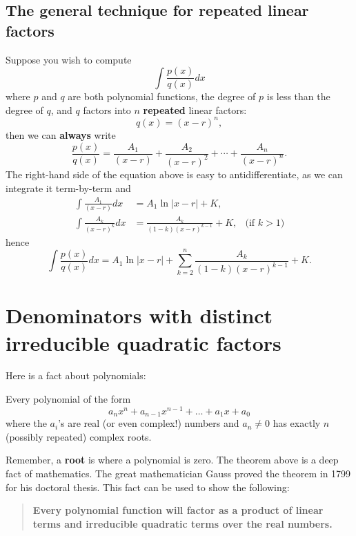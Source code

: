 \documentclass{ximera}
\begin{document}
\subsection{The general technique for repeated linear factors}

Suppose you wish to compute
\[
\int \frac{p(x)}{q(x)} dx
\]
where $p$ and $q$ are both polynomial functions, the degree of $p$ is
less than the degree of $q$, and $q$ factors into $n$
\textbf{repeated} linear factors:
\[
q(x) = (x-r)^n,
\]
then we can \textbf{always} write
\[
\frac{p(x)}{q(x)}  = \frac{A_1}{(x-r)} + \frac{A_2}{(x-r)^2} + \cdots + \frac{A_n}{(x-r)^n}. 
\]
The right-hand side of the equation above is easy to
antidifferentiate, as we can integrate it term-by-term and
\begin{align*}
  \int \frac{A_1}{(x-r)} dx &= A_1 \ln|x-r| + K,\\
  \int \frac{A_k}{(x-r)^k} dx &= \frac{A_k}{(1-k)(x-r)^{k-1}}+ K, &\text{(if $k>1$)}
\end{align*}
hence
\[
\int \frac{p(x)}{q(x)} dx = A_1 \ln|x-r|  + \sum_{k=2}^n \frac{A_k}{(1-k)(x-r)^{k-1}} + K.
\]






\section{Denominators with distinct irreducible quadratic factors}

Here is a fact about polynomials:

\begin{theorem}
  Every polynomial of the form
  \[
  a_n x^n + a_{n-1} x^{n-1} + \dots + a_1 x + a_0
  \]
  where the $a_i$'s are real (or even complex!) numbers and $a_n \ne 0$ has exactly
  $n$ (possibly repeated) complex roots.
\end{theorem}

Remember, a \textbf{root} is where a polynomial is zero. The theorem
above is a deep fact of mathematics. The great mathematician Gauss
proved the theorem in 1799 for his doctoral thesis. This fact can be
used to show the following:
\begin{quote}
  \textbf{Every polynomial function will factor as a product of linear
    terms and irreducible quadratic terms over the real numbers.}
\end{quote}
\end{document}
